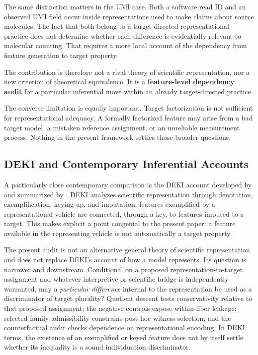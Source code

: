 \documentclass[11pt]{article}
\begin{document}
The same distinction matters in the UMI case. Both a software read ID and an observed UMI field occur inside representations used to make claims about source molecules. The fact that both belong to a target-directed representational practice does not determine whether each difference is evidentially relevant to molecular counting. That requires a more local account of the dependency from feature generation to target property.

The contribution is therefore not a rival theory of scientific representation, nor a new criterion of theoretical equivalence. It is a \textbf{feature-level dependency audit} for a particular inferential move within an already target-directed practice.

The converse limitation is equally important. Target factorization is not sufficient for representational adequacy. A formally factorized feature may arise from a bad target model, a mistaken reference assignment, or an unreliable measurement process. Nothing in the present framework settles those broader questions.

\subsection{DEKI and Contemporary Inferential Accounts}

A particularly close contemporary comparison is the DEKI account developed by \citet{FriggNguyen2020ModellingNature} and summarized by \citet{NguyenFrigg2022ScientificRepresentation}. DEKI analyzes scientific representation through denotation, exemplification, keying-up, and imputation: features exemplified by a representational vehicle are connected, through a key, to features imputed to a target. This makes explicit a point congenial to the present paper: a feature available in the representing vehicle is not automatically a target property.

The present audit is not an alternative general theory of scientific representation and does not replace DEKI's account of how a model represents. Its question is narrower and downstream. Conditional on a proposed representation-to-target assignment and whatever interpretive or scientific bridge is independently warranted, may a \emph{particular difference} internal to the representation be used as a discriminator of target plurality? Quotient descent tests conservativity relative to that proposed assignment; the negative controls expose within-fiber leakage; selected-family admissibility constrains post-hoc witness selection; and the counterfactual audit checks dependence on representational encoding. In DEKI terms, the existence of an exemplified or keyed feature does not by itself settle whether its inequality is a sound individuation discriminator.
\end{document}
